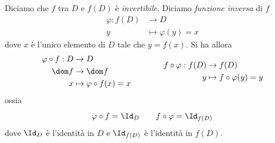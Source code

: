 Diciamo che $ f $ tra $ D $ e $ f(D) $ è \textit{invertibile}. Diciamo \textit{funzione inversa} di $ f $ \begin{align*}
\varphi:f(D) & \to D \\
y & \mapsto \varphi(y)=x
\end{align*} dove $ x $ è l'unico elemento di $ D $ tale che $ y=f(x) $. Si ha allora 
\[
    \begin{aligned}
        \varphi\circ f: D&\to D\\
        \dom f&\to \dom f\\
        x &\mapsto \varphi\circ f(x)=x
    \end{aligned}\hspace{4em}\begin{aligned}
        f\circ\varphi: f(D) &\to f(D)\\
        y&\mapsto f\circ\varphi(y)=y
    \end{aligned}
\] ossia \begin{equation}
    \varphi \circ f =\Id_{D} \qquad f\circ\varphi = \Id_{f(D)} 
\end{equation} dove $ \Id_{D}  $ è l'identità in $ D $ e $ \Id_{f(D)}  $ è l'identità in $ f(D) $.

